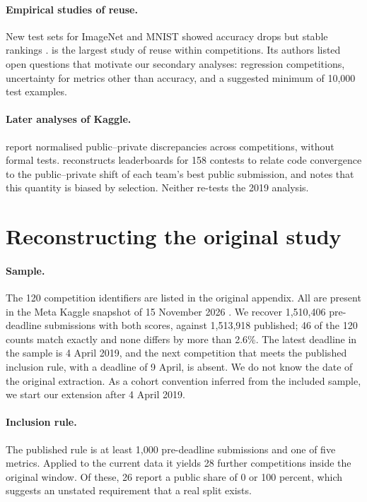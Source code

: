 \documentclass[10pt]{article}
\begin{document}
\paragraph{Empirical studies of reuse.} New test sets for ImageNet and MNIST showed accuracy drops but stable rankings \citep{recht2019imagenet,yadav2019cold}. \citet{roelofs2019meta} is the largest study of reuse within competitions. Its authors listed open questions that motivate our secondary analyses: regression competitions, uncertainty for metrics other than accuracy, and a suggested minimum of 10,000 test examples.

\paragraph{Later analyses of Kaggle.} \citet{bonisch2025chronicles} report normalised public--private discrepancies across competitions, without formal tests. \citet{burtch2026monoculture} reconstructs leaderboards for 158 contests to relate code convergence to the public--private shift of each team's best public submission, and notes that this quantity is biased by selection. Neither re-tests the 2019 analysis.

\section{Reconstructing the original study}
\label{sec:recon}

\paragraph{Sample.} The 120 competition identifiers are listed in the original appendix. All are present in the Meta Kaggle snapshot of 15 November 2026 \citep{metakaggle}. We recover 1,510,406 pre-deadline submissions with both scores, against 1,513,918 published; 46 of the 120 counts match exactly and none differs by more than 2.6\%. The latest deadline in the sample is 4 April 2019, and the next competition that meets the published inclusion rule, with a deadline of 9 April, is absent. We do not know the date of the original extraction. As a cohort convention inferred from the included sample, we start our extension after 4 April 2019.

\paragraph{Inclusion rule.} The published rule is at least 1,000 pre-deadline submissions and one of five metrics. Applied to the current data it yields 28 further competitions inside the original window. Of these, 26 report a public share of 0 or 100 percent, which suggests an unstated requirement that a real split exists.
\end{document}
